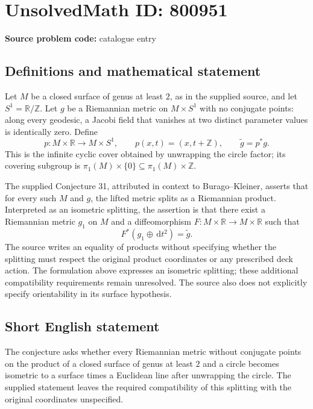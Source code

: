 \documentclass[11pt]{article}
\newcommand{\Z}{\mathbb{Z}}
\newcommand{\R}{\mathbb{R}}
\newcommand{\dd}{\,\mathrm{d}}
\begin{document}
\section*{UnsolvedMath ID: 800951}
\textbf{Source problem code:} catalogue entry
\subsection{Definitions and mathematical statement}
Let \(M\) be a closed surface of genus at least \(2\), as in the supplied source, and let \(S^1=\R/\Z\). Let \(g\) be a Riemannian metric on \(M\times S^1\) with no conjugate points: along every geodesic, a Jacobi field that vanishes at two distinct parameter values is identically zero. Define
\[
p:M\times\R\longrightarrow M\times S^1,\qquad p(x,t)=(x,t+\Z),
\qquad \widetilde g=p^*g.
\]
This is the infinite cyclic cover obtained by unwrapping the circle factor; its covering subgroup is \(\pi_1(M)\times\{0\}\subseteq\pi_1(M)\times\Z\).

The supplied Conjecture 31, attributed in context to Burago--Kleiner, asserts that for every such \(M\) and \(g\), the lifted metric splits as a Riemannian product. Interpreted as an isometric splitting, the assertion is that there exist a Riemannian metric \(g_1\) on \(M\) and a diffeomorphism \(F:M\times\R\to M\times\R\) such that
\[
F^*(g_1\oplus\dd t^2)=\widetilde g.
\]
The source writes an equality of products without specifying whether the splitting must respect the original product coordinates or any prescribed deck action. The formulation above expresses an isometric splitting; these additional compatibility requirements remain unresolved. The source also does not explicitly specify orientability in its surface hypothesis.
\subsection{Short English statement}
The conjecture asks whether every Riemannian metric without conjugate points on the product of a closed surface of genus at least \(2\) and a circle becomes isometric to a surface times a Euclidean line after unwrapping the circle. The supplied statement leaves the required compatibility of this splitting with the original coordinates unspecified.
\end{document}
